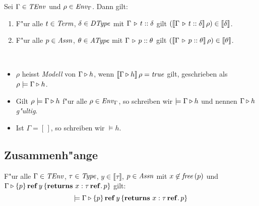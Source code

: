 \documentclass[12pt,a4paper,bigheadings]{scrartcl}
\newcommand{\semantic}[1]{\ensuremath{\llbracket#1\rrbracket}}
\newcommand{\TEnv}{\name{TEnv}}
\newcommand{\Dtype}{\name{DType}}
\newcommand{\Atype}{\name{AType}}
\newcommand{\Assn}{\name{Assn}}
\newcommand{\Term}{\name{Term}}
\begin{document}
\begin{satz}
  Sei $\Gamma \in \TEnv$ und $\rho \in {\text{\it Env\/}}_\Gamma$. Dann gilt:
  \begin{enumerate}
    \item F"ur alle $t \in \Term$, $\delta \in \Dtype$ mit $\Gamma \, \triangleright \, t\mathrel{::}\delta$ gilt
          $(\semantic{\Tj{\Gamma}{t}{\delta}}\,\rho)\in\semantic{\delta}$.
    \item F"ur alle $p \in \Assn$, $\theta \in \Atype$ mit $\Gamma \, \triangleright \, p\mathrel{::}\theta$ gilt
          $(\semantic{\Tj{\Gamma}{p}{\theta}}\,\rho)\in\semantic{\theta}$.
  \end{enumerate}
\end{satz}

\begin{beweis}
\end{beweis}

\begin{definition}[Modell] \
  \begin{itemize}
    \item $\rho$ heisst {\em Modell} von $\Gamma \triangleright h$, wenn $\semantic{\Tjh{\Gamma}{h}}\,\rho = \true$
          gilt, geschrieben als $\rho \models \Gamma \triangleright h$.
    \item Gilt $\rho \models \Gamma \triangleright h$ f"ur alle $\rho\in{\text{\it Env\/}}_\Gamma$, so schreiben wir
          $\models \Gamma \triangleright h$ und nennen  $\Gamma \triangleright h$ {\em g"ultig}.
    \item Ist $\Gamma = [\,]$, so schreiben wir $\models h$.
  \end{itemize}
\end{definition}


\subsection{Zusammenh"ange}

\begin{lemma}
  F"ur alle $\Gamma\in\TEnv$, $\tau\in{\text{\it Type\/}}$, $y\in\semantic{\tau}$, $p \in\Assn$ mit
  $x \not \in {\text{\it free\/}}\,(p)$ und $\Gamma \triangleright \{p\}\,\mathbf{ref}\,y\,\{{\bf returns}\ x:\tau\,\mathbf{ref}.\, p\}$ gilt:
  \[
    \models \Gamma \triangleright \{p\}\,\mathbf{ref}\,y\,\{{\bf returns}\ x:\tau\,\mathbf{ref}.\, p\}
  \]
\end{lemma}
\end{document}

